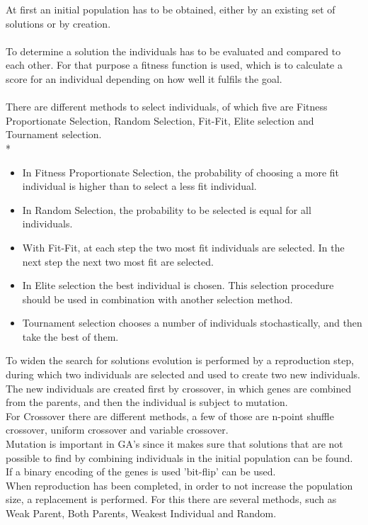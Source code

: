 At first an initial population has to be obtained, either by an existing set of solutions or by creation.\\
\\To determine a solution the individuals has to be evaluated and compared to each other. For that purpose a fitness function is used, which is to calculate a score for an individual depending on how well it fulfils the goal.\\
\\There are different methods to select individuals, of which five are Fitness Proportionate Selection, Random Selection, Fit-Fit, Elite selection and Tournament selection.\\*
\begin{itemize}
\item In Fitness Proportionate Selection, the probability of choosing a more fit individual is higher than to select a less fit individual.
\item In Random Selection, the probability to be selected is equal for all individuals. 
\item With Fit-Fit, at each step the two most fit individuals are selected. In the next step the next two most fit are selected.
\item In Elite selection the best individual is chosen. This selection procedure should be used in combination with another selection method.
\item Tournament selection chooses a number of individuals stochastically, and then take the best of them.
\end{itemize}
To widen the search for solutions evolution is performed by a reproduction step, during which two individuals are selected and used to create two new individuals. The new individuals are created first by crossover, in which genes are combined from the parents, and then the individual is subject to mutation.\\
For Crossover there are different methods, a few of those are n-point shuffle crossover, uniform crossover and variable crossover.\\
Mutation is important in GA's since it makes sure that solutions that are not possible to find by combining individuals in the initial population can be found. If a binary encoding of the genes is used 'bit-flip' can be used.\\
When reproduction has been completed, in order to not increase the population size, a replacement is performed. For this there are several methods, such as Weak Parent, Both Parents, Weakest Individual and Random.
